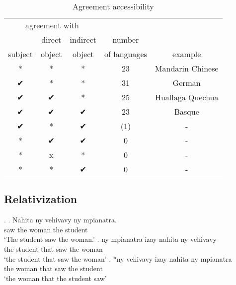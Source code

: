 \begin{table}[H]
  \center
  \caption {Agreement accessibility}
    \begin{tabular}[t]{ccccc}
      \toprule
            \multicolumn{3}{c}{agreement with}
            &
          & \\
      \cmidrule{1-3}
            & direct
            & indirect
            & number
          & \\
            subject
            & object
            & object
            & of languages
          & example \\
      \cmidrule{1-3} \cmidrule{4-4} \cmidrule{5-5}
            *
            & *
            & *
            & 23
          & Mandarin Chinese \\
            ✔
            & *
            & *
            & 31
          & German \\
            ✔
            & ✔
            & *
            & 25
          & Huallaga Quechua \\
            ✔
            & ✔
            & ✔
            & 23
          & Basque \\
            ✔
            & *
            & ✔
            & (1)
          & - \\
            {*}
            & ✔
            & ✔
            & 0
          & - \\
            {*}
            & x
            & *
            & 0
          & - \\
            {*}
            & *
            & ✔
            & 0
          & - \\
      \bottomrule
    \end{tabular}
\end{table}



\subsection{Relativization}


\ex.
\ag. Nahita ny vehivavy ny mpianatra.\\
 saw the woman the student\\
 `The student saw the woman.'
\bg. ny mpianatra izay nahita ny vehivavy\\
 the student that saw the woman\\
 `the student that saw the woman'
\bg. *ny vehivavy izay nahita ny mpianatra\\
 the woman that saw the student\\
 `the woman that the student saw' 

